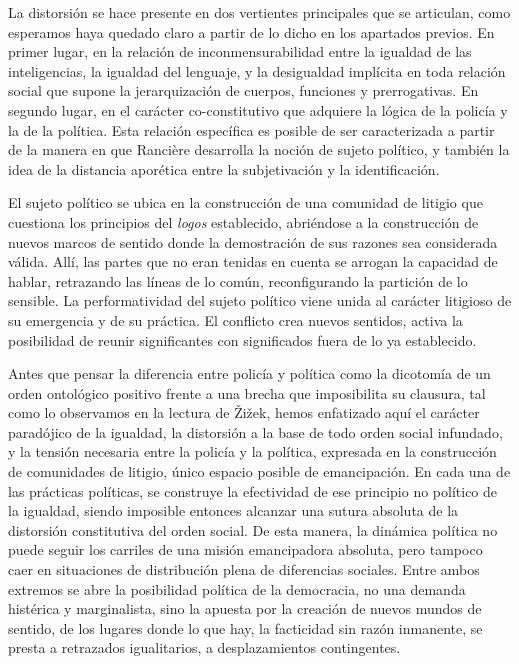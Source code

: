 La distorsión se hace presente en dos vertientes principales que se articulan, como esperamos haya quedado claro a partir de lo dicho en los apartados previos. En primer lugar, en la relación de inconmensurabilidad entre la igualdad de las inteligencias, la igualdad del lenguaje, y la desigualdad implícita en toda relación social que supone la jerarquización de cuerpos, funciones y prerrogativas. En segundo lugar, en el carácter co-constitutivo que adquiere la lógica de la policía y la de la política. Esta relación específica es posible de ser caracterizada a partir de la manera en que Rancière desarrolla la noción de sujeto político, y también la idea de la distancia aporética entre la subjetivación y la identificación.

El sujeto político se ubica en la construcción de una comunidad de litigio que cuestiona los principios del \emph{logos} establecido, abriéndose a la construcción de nuevos marcos de sentido donde la demostración de sus razones sea considerada válida. Allí, las partes que no eran tenidas en cuenta se arrogan la capacidad de hablar, retrazando las líneas de lo común, reconfigurando la partición de lo sensible. La performatividad del sujeto político viene unida al carácter litigioso de su emergencia y de su práctica. El conflicto crea nuevos sentidos, activa la posibilidad de reunir significantes con significados fuera de lo ya establecido.

Antes que pensar la diferencia entre policía y política como la dicotomía de un orden ontológico positivo frente a una brecha que imposibilita su clausura, tal como lo observamos en la lectura de Žižek, hemos enfatizado aquí el carácter paradójico  de la igualdad, la distorsión a la base de todo orden social infundado, y la tensión necesaria entre la policía y la política, expresada en la construcción de comunidades de litigio, único espacio posible de emancipación. En cada una de las prácticas políticas, se construye la efectividad de ese principio no político de la igualdad, siendo imposible entonces alcanzar una sutura absoluta de la distorsión constitutiva del orden social. De esta manera, la dinámica política no puede seguir los carriles de una misión emancipadora absoluta, pero tampoco caer en situaciones de distribución plena de diferencias sociales. Entre ambos extremos se abre la posibilidad política de la democracia, no una demanda histérica y marginalista, sino la apuesta por la creación de nuevos mundos de sentido, de los lugares donde lo que hay, la facticidad sin razón inmanente, se presta a retrazados igualitarios, a desplazamientos contingentes.


